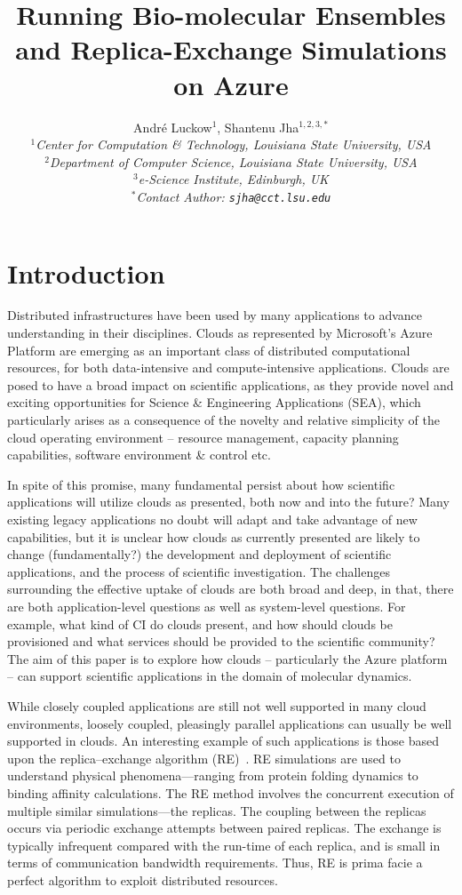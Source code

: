 \documentclass[conference,final]{IEEEtran}
\title{Running Bio-molecular Ensembles and Replica-Exchange Simulations on Azure}
\author{
Andr\'e Luckow$^{1}$, Shantenu Jha$^{1,2,3,*}$\\
  \small{\emph{$^{1}$Center for Computation \& Technology, Louisiana State University, USA}}\\
  \small{\emph{$^{2}$Department of Computer Science, Louisiana State University, USA}}\\
  \small{\emph{$^{3}$e-Science Institute, Edinburgh, UK}}\\
  \small{\emph{$^{*}$Contact Author: \texttt{sjha@cct.lsu.edu}}}\\
}
\begin{document}
 

\maketitle    

\begin{abstract}
  
\end{abstract}

\section{Introduction}

Distributed infrastructures have been used by many applications to
advance understanding in their disciplines. Clouds as represented by Microsoft’s 
Azure Platform are emerging as an important class of distributed computational 
resources, for both data-intensive and compute-intensive applications. Clouds 
are posed to have a broad impact on scientific applications, as they provide 
novel and exciting opportunities for Science \& Engineering Applications (SEA),
which particularly arises as a consequence of the novelty 
and relative simplicity of the cloud operating environment – resource management, 
capacity planning capabilities, software environment \& control etc. 

In spite of this promise, many fundamental persist about how scientific applications 
will utilize clouds as presented, both now and into the future? Many existing legacy 
applications no doubt will adapt and take advantage of new capabilities, but it 
is unclear how clouds as currently presented are likely to change (fundamentally?) 
the development and deployment of scientific applications, and the process of 
scientific investigation. The challenges  surrounding the effective uptake of clouds 
are both broad and deep, in that, there 
are both application-level questions as well as system-level questions. For example, 
what kind of CI do clouds present, and how should clouds be provisioned and what 
services should be provided to the scientific community? The aim of this paper is to
explore how clouds -- particularly the Azure platform -- can support scientific 
applications in the domain of molecular dynamics.


While closely coupled applications are still not well supported in many cloud environments,
loosely coupled, pleasingly parallel applications can usually be well supported in clouds.
An interesting example of such applications is those based upon the replica–exchange 
algorithm (RE)~\cite{hansmann}. RE simulations are used to understand physical phenomena—ranging 
from protein folding dynamics to binding affinity calculations. The RE method involves 
the concurrent execution of multiple similar simulations—the replicas. The coupling 
between the replicas occurs via periodic exchange attempts between paired replicas.
The exchange is typically infrequent compared with the run-time of each replica, and 
is small in terms of communication bandwidth requirements. Thus, RE is prima facie a 
perfect algorithm to exploit distributed resources.
\end{document}

